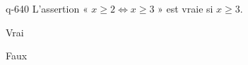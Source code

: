 \begin{truefalse}{q-640}
L'assertion « $x\geq 2 \Leftrightarrow x \geq 3$ » est vraie si $x\geq 3$.
\item* Vrai
\item Faux
\end{truefalse}

